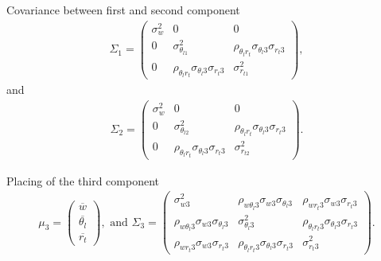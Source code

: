\documentclass[10pt]{beamer}
\numberwithin{equation}{section}
\begin{document}
    \begin{frame}{Covariance between first and second component}
        \begin{align}
            \Sigma_1 =
            \begin{pmatrix}
                \sigma_w^2 & 0                                                      & 0                                                      \\
                0          & \sigma_{\theta_{l1}}^2                                 & \rho_{\theta_l r_t} \sigma_{\theta_l 3} \sigma_{r_t 3} \\
                0          & \rho_{\theta_l r_t} \sigma_{\theta_l 3} \sigma_{r_t 3} & \sigma_{r_{t1}}^2
            \end{pmatrix},
        \end{align}
        and
        \begin{align}
            \Sigma_2 =
            \begin{pmatrix}
                \sigma_w^2 & 0                                                      & 0                                                      \\
                0          & \sigma_{\theta_{l2}}^2                                 & \rho_{\theta_l r_t} \sigma_{\theta_l 3} \sigma_{r_t 3} \\
                0          & \rho_{\theta_l r_t} \sigma_{\theta_l 3} \sigma_{r_t 3} & \sigma_{r_{t2}}^2
            \end{pmatrix}.
        \end{align}
    \end{frame}

    \begin{frame}{Placing of the third component}
        \begin{align}
            \mu_3 =
            \begin{pmatrix}
                \overline{w}        \\
                \overline{\theta_l} \\
                \overline{r_t}
            \end{pmatrix},
            \text{ and }
            \Sigma_3 =
            \begin{pmatrix}
                \sigma_{w 3}^2 &
                \rho_{w \theta_l 3} \sigma_{w 3} \sigma_{\theta_l 3} &
                \rho_{w r_t 3} \sigma_{w 3} \sigma_{r_t 3} \\
                \rho_{w \theta_l 3} \sigma_{w 3} \sigma_{\theta_l 3} &
                \sigma_{\theta_l 3}^2 &
                \rho_{\theta_l r_t 3} \sigma_{\theta_l 3} \sigma_{r_t 3} \\
                \rho_{w r_t 3} \sigma_{w 3} \sigma_{r_t 3} &
                \rho_{\theta_l r_t 3} \sigma_{\theta_l 3} \sigma_{r_t 3} &
                \sigma_{r_t 3}^2
            \end{pmatrix}.
        \end{align}
    \end{frame}
\end{document}
